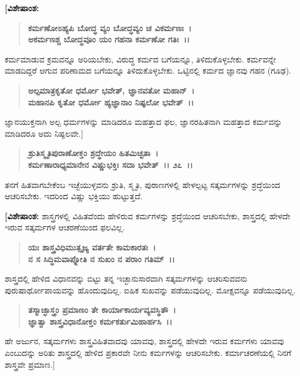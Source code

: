\textbf{[ವಿಶೇಷಾಂಶ:}

\begin{verse}
\textbf{ಕರ್ಮಣೋಽಹ್ಯಪಿ ಬೋದ್ಧ ವ್ಯಂ ಬೋದ್ಧವ್ಯಂ ಚ ವಿಕರ್ಮಣಃ~।}\\\textbf{ಅಕರ್ಮಣಶ್ಚ ಬೋದ್ಧವೂಂ ಯಂ ಗಹನಾ ಕರ್ಮಣೋ ಗತಿಃ~।।}
\end{verse}

ಕರ್ಮಮಾಡುವ ಕ್ರಮವನ್ನೂ ಅರಿಯಬೇಕು, ವಿರುದ್ಧ ಕರ್ಮದ ಬಗೆಯನ್ನೂ, ತಿಳಿದುಕೊಳ್ಳಬೇಕು. ಕರ್ಮವನ್ನೇ ಮಾಡದಿದ್ದರೆ ಆಗುವ ಪರಿಣಾಮದ ಬಗೆಯನ್ನೂ ತಿಳಿದುಕೊಳ್ಳಬೇಕು. ಒಟ್ಟಿನಲ್ಲಿ ಕರ್ಮದ ಜ್ಞಾನವು ಗಹನ (ಗೂಢ).

\begin{verse}
\textbf{ಅಲ್ಪಮಾತ್ರಕೃತೋ ಧರ್ಮೋ ಭವೇತ್, ಜ್ಞಾನವತೋ ಮಹಾನ್~।}\\\textbf{ಮಹಾನಪಿ ಕೃತೋ ಧರ್ಮೋ ಹ್ಯಜ್ಞಾನಾಂ ನಿಷ್ಫಲೋ ಭವೇತ್~।।}
\end{verse}

ಜ್ಞಾನಯುಕ್ತನಾಗಿ ಅಲ್ಪ ಧರ್ಮಗಳನ್ನು ಮಾಡಿದರೂ ಮಹತ್ತಾದ ಫಲ, ಜ್ಞಾನರಹಿತನಾಗಿ ಮಹತ್ತಾದ ಕರ್ಮವನ್ನು ಮಾಡಿದರೂ ಅದು ನಿಷ್ಫಲವೇ.]

\begin{verse}
\textbf{ಶ್ರುತಿಸ್ಮೃತಿಪುರಾಣೋಕ್ತಂ ಶ್ರದ್ಧೇಯಂ ಹಿತಮಿಚ್ಛತಾ~।}\\\textbf{ಕರ್ಮಣಾರಾಧ್ಯಮಾನೇನ ವಿಷ್ಣುಭಕ್ತಿಃ ಸದಾ ಭವೇತ್~।। ೨೭~।।}
\end{verse}

ತನಗೆ ಹಿತವಾಗಬೇಕೆಂಬ ಇಚ್ಛೆಯುಳ್ಳವನು ಶ್ರುತಿ, ಸ್ಮೃತಿ, ಪುರಾಣಗಳಲ್ಲಿ ಹೇಳಲ್ಪಟ್ಟ ಸತ್ಕರ್ಮಗಳನ್ನು ಶ್ರದ್ಧೆಯಿಂದ ಆಚರಿಸಬೇಕು. ಇದರಿಂದ ವಿಷ್ಣು ಭಕ್ತಿಯು ಹುಟ್ಟುತ್ತದೆ.

\textbf{[ವಿಶೇಷಾಂಶ:} ಶಾಸ್ತ್ರಗಳಲ್ಲಿ ವಿಹಿತವೆಂದು ಹೇಳಿರುವ ಕರ್ಮಗಳನ್ನು ಶ್ರದ್ಧೆಯಿಂದ ಆಚರಿಸ\-ಬೇಕು, ಶಾಸ್ತ್ರದಲ್ಲಿ ಹೇಳದೇ ಇರುವ ಸತ್ಕರ್ಮಗಳ ಆಚರಣೆಯಿಂದ ಫಲವಿಲ್ಲ.

\begin{verse}
\textbf{ಯಃ ಶಾಸ್ತ್ರವಿಧಿಮುತ್ಸೃಜ್ಯ ವರ್ತತೇ ಕಾಮಕಾರತಃ~।}\\\textbf{ನ ಸ ಸಿದ್ಧಿಮವಾಪ್ನೋತಿ ನ ಸುಖಂ ನ ಪರಾಂ ಗತಿಮ್~।।} 
\end{verse}

ಶಾಸ್ತ್ರದಲ್ಲಿ ಹೇಳಿದ ವಿಧಾನವನ್ನು ಬಿಟ್ಟು ತನ್ನ ಇಚ್ಛಾನುಸಾರವಾಗಿ ಸತ್ಕರ್ಮಗಳನ್ನು ಆಚರಿಸು\-ವವನು ಪುರುಷಾರ್ಥೋಪಾಯವನ್ನು ಹೊಂದುವುದಿಲ್ಲ. ಐಹಿಕ ಸುಖವನ್ನು ಪಡೆಯುವುದಿಲ್ಲ. ಮೋಕ್ಷವನ್ನೂ ಪಡೆಯುವುದಿಲ್ಲ.

\begin{verse}
\textbf{ತಸ್ಮಾಚ್ಛಾಸ್ತ್ರಂ ಪ್ರಮಾಣಂ ತೇ ಕಾರ್ಯಾಕಾರ್ಯವ್ಯವಸ್ಥಿತೌ~।}\\\textbf{ಜ್ಞಾತ್ವಾ ಶಾಸ್ತ್ರವಿಧಾನೋಕ್ತಂ ಕರ್ಮಕರ್ತುಮಿಹಾರ್ಹಸಿ~।।} 
\end{verse}

ಹೇ ಅರ್ಜುನ, ಸತ್ಕರ್ಮಗಳು ಶಾಸ್ತ್ರವಿಹಿತವಾದವು ಯಾವವು, ಶಾಸ್ತ್ರದಲ್ಲಿ ಹೇಳದೇ ಇರುವ ಕರ್ಮಗಳು ಯಾವವು ಎಂಬುದನ್ನು ಅರಿತು ಶಾಸ್ತ್ರದಲ್ಲಿ ಹೇಳಿದ ಪ್ರಕಾರವೇ ನೀನು ಕರ್ಮಗಳನ್ನು ಆಚರಿಸಬೇಕು. ಕರ್ಮಾಚರಣೆಯಲ್ಲಿ ನಿನಗೆ ಶಾಸ್ತ್ರವೇ ಪ್ರಮಾಣ.]

